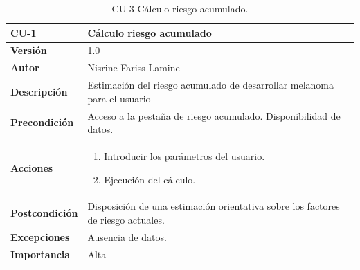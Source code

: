 \begin{table}[p]
	\centering
	\begin{tabularx}{\linewidth}{ p{} p{} }
		\toprule
		\textbf{CU-1}    & \textbf{Cálculo riesgo acumulado}\\
		\toprule
		\textbf{Versión}              & 1.0    \\
		\textbf{Autor}                & Nisrine Fariss Lamine \\
		
		\textbf{Descripción}          & Estimación del riesgo acumulado de desarrollar melanoma para el usuario \\
		\textbf{Precondición}         & Acceso a la pestaña de riesgo acumulado. Disponibilidad de datos. \\
		\textbf{Acciones}             &
		\begin{enumerate}
			\def\labelenumi{\arabic{enumi}.}
			\tightlist
			\item Introducir los parámetros del usuario.
			\item Ejecución del cálculo.
		\end{enumerate}\\
		\textbf{Postcondición}        & Disposición de una estimación orientativa sobre los factores de riesgo actuales. \\
		\textbf{Excepciones}          & Ausencia de datos. \\
		\textbf{Importancia}          & Alta  \\
		\bottomrule
	\end{tabularx}
	\caption{CU-3 Cálculo riesgo acumulado.}
\end{table}



